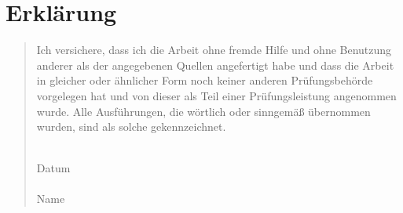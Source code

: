 \chapter*{Erklärung}
\begin{quote}

\vspace*{3cm}

Ich versichere, dass ich die Arbeit ohne fremde Hilfe und ohne Benutzung anderer als der angegebenen Quellen angefertigt habe und dass die Arbeit in gleicher oder ähnlicher Form noch keiner anderen Prüfungsbehörde vorgelegen hat und von dieser als Teil einer Prüfungsleistung angenommen wurde. Alle Ausführungen, die wörtlich oder sinngemäß übernommen wurden, sind als solche gekennzeichnet.

\vspace*{2cm}

\begin{flushright}
\underline{\hspace{4cm}}\\
Datum\\
\vspace*{1cm}
\underline{\hspace{4cm}}\\
Name
\end{flushright}

\end{quote}

